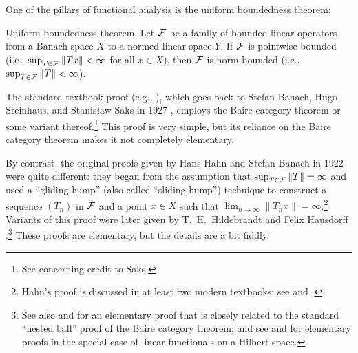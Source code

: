 \documentclass[12pt]{article}
\begin{document}
\newenvironment{scarray}{
             \textfont0=\scriptfont0
             \scriptfont0=\scriptscriptfont0
             \textfont1=\scriptfont1
             \scriptfont1=\scriptscriptfont1
             \textfont2=\scriptfont2
             \scriptfont2=\scriptscriptfont2
             \textfont3=\scriptfont3
             \scriptfont3=\scriptscriptfont3
           \renewcommand{\arraystretch}{0.7}
           \begin{array}{c}}{\end{array}}



\clearpage


One of the pillars of functional analysis is the
uniform boundedness theorem:

\bigskip

{\sc Uniform boundedness theorem.}
Let ${\mathcal{F}}$ be a family of bounded linear operators
from a Banach space $X$ to a normed linear space $Y$.
If ${\mathcal{F}}$ is pointwise bounded
(i.e., $\sup_{T \in {\mathcal{F}}} \|Tx\| < \infty$ for all $x \in X$),
then ${\mathcal{F}}$ is norm-bounded
(i.e., $\sup_{T \in {\mathcal{F}}} \|T\| < \infty$).

\bigskip

The standard textbook proof
(e.g., \cite[p.~81]{Reed_72}),
which goes back to Stefan Banach, Hugo Steinhaus,
and Stanis\l{}aw Saks in 1927 \cite{Banach_27},
employs the Baire category theorem or some variant thereof.\footnote{
   See \cite[p.~319, note~67]{Birkhoff_84} concerning credit to Saks.
}
This proof is very simple,
but its reliance on the Baire category theorem makes it
not completely elementary.

By contrast, the original proofs
given by Hans Hahn \cite{Hahn_22} and Stefan Banach \cite{Banach_22}
in 1922 were quite different:
they began from the assumption that $\sup_{T \in {\mathcal{F}}} \|T\| = \infty$
and used a ``gliding hump'' (also called ``sliding hump'') technique
to construct a sequence $(T_n)$ in ${\mathcal{F}}$ and a point $x \in X$
such that $\lim_{n \to\infty} \|T_n x \| = \infty$.\footnote{
   Hahn's proof is discussed in at least two modern textbooks:
   see \cite[Exercise~1.76, p.~49]{Megginson_98} and
   \cite[Exercise~3.15, pp.~71--72]{MacCluer_09}.
}
Variants of this proof were later given by
T.~H.~Hildebrandt \cite{Hildebrandt_23}
and Felix Hausdorff \cite{Hausdorff_32,Hennefeld_80}.\footnote{
   See also \cite[pp.~63--64]{Riesz_55} and \cite[pp.~74--75]{Weidmann_80}
   for an elementary proof that is closely related to the standard
   ``nested ball'' proof of the Baire category theorem;
   and see \cite[Problem 27, pp.~14--15 and 184]{Halmos_67}
   and \cite{Holland_69} for elementary proofs
   in the special case of linear functionals on a Hilbert space.
}
These proofs are elementary, but the details are a bit fiddly.
\end{document}
